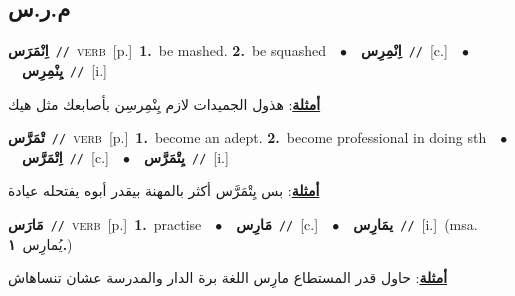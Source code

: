 \documentclass[10pt,a4paper,twoside]{article} %
\begin{document}
\begin{multicols}{2}
\vspace{-3mm}
\subsection*{\color{blue}\foreignlanguage{arabic}{م.ر.س}\color{blue}{}} 

{\setlength\topsep{0pt}\textbf{\foreignlanguage{arabic}{اِنْمَرَس}}\ {\color{gray}\texttt{//}\color{black}}\ \textsc{verb}\ [p.]\ \textbf{1.}~be mashed.  \textbf{2.}~be squashed\ \ $\bullet$\ \ \setlength\topsep{0pt}\textbf{\foreignlanguage{arabic}{اِنْمِرِس}}\ {\color{gray}\texttt{//}\color{black}}\ [c.]\ \ $\bullet$\ \ \setlength\topsep{0pt}\textbf{\foreignlanguage{arabic}{يِنْمِرِس}}\ {\color{gray}\texttt{//}\color{black}}\ [i.]\  \begin{flushright}\color{gray}\foreignlanguage{arabic}{\textbf{\underline{\foreignlanguage{arabic}{أمثلة}}}: هذول الجميدات لازم يِنْمِرسِن بأصابعك مثل هيك}\end{flushright}\color{black}} \vspace{2mm}

{\setlength\topsep{0pt}\textbf{\foreignlanguage{arabic}{تْمَرَّس}}\ {\color{gray}\texttt{//}\color{black}}\ \textsc{verb}\ [p.]\ \textbf{1.}~become an adept.  \textbf{2.}~become professional in doing sth\ \ $\bullet$\ \ \setlength\topsep{0pt}\textbf{\foreignlanguage{arabic}{اِتْمَرَّس}}\ {\color{gray}\texttt{//}\color{black}}\ [c.]\ \ $\bullet$\ \ \setlength\topsep{0pt}\textbf{\foreignlanguage{arabic}{يِتْمَرَّس}}\ {\color{gray}\texttt{//}\color{black}}\ [i.]\  \begin{flushright}\color{gray}\foreignlanguage{arabic}{\textbf{\underline{\foreignlanguage{arabic}{أمثلة}}}: بس يِتْمَرَّس أكثر بالمهنة بيقدر أبوه يفتحله عيادة}\end{flushright}\color{black}} \vspace{2mm}

{\setlength\topsep{0pt}\textbf{\foreignlanguage{arabic}{مَارَس}}\ {\color{gray}\texttt{//}\color{black}}\ \textsc{verb}\ [p.]\ \textbf{1.}~practise\ \ $\bullet$\ \ \setlength\topsep{0pt}\textbf{\foreignlanguage{arabic}{مَارِس}}\ {\color{gray}\texttt{//}\color{black}}\ [c.]\ \ $\bullet$\ \ \setlength\topsep{0pt}\textbf{\foreignlanguage{arabic}{يمَارِس}}\ {\color{gray}\texttt{//}\color{black}}\ [i.]\ \color{gray}(msa. \foreignlanguage{arabic}{يُمارِس}~\foreignlanguage{arabic}{\textbf{١.}})\color{black}\  \begin{flushright}\color{gray}\foreignlanguage{arabic}{\textbf{\underline{\foreignlanguage{arabic}{أمثلة}}}: حاول قدر المستطاع مارِس اللغة برة الدار والمدرسة عشان تنساهاش}\end{flushright}\color{black}} \vspace{2mm}


\end{multicols}
\end{document}
